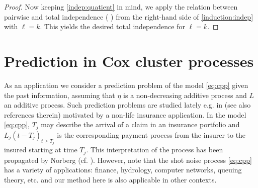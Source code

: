 \documentclass[11pt,leqno%
]{amsart}
\newcommand{\E }{{\mathbb E}}
\newcommand{\1}{{\mathbf 1}}
\begin{document}
\begin{proof}
Now keeping \eqref{indep:quatient} in mind, we apply the
 relation between pairwise and total independence (%
 \cite[Lemma 3.8]{kallenberg:1983}) from the right-hand side of
 \eqref{induction:indep} with $\ell=k$. This yields the desired total independence for $\ell=k$.
\end{proof}

\section{Prediction in Cox cluster processes}\label{sec:prediction}
 As an application %
 we consider a prediction
 problem of the model \eqref{eq:cpp} given the past information, 
 assuming that $\eta$ is a non-decreasing additive process and $L$ an
 additive process. 
 Such prediction problems are studied lately e.g. in 
\cite{LBPJ:1999,matsui:mikosch:2010,rolski:tomanek:2011,rolski:tomanek:2014,matsui:rolski:2016,matsui:2016} (see also references therein) motivated by 
 a non-life insurance application. 
 In the model \eqref{eq:cpp}, $T_j$ may describe the arrival of a
 claim in an insurance portfolio and $L_j(t-T_j)_{t\ge T_j}$ is the corresponding payment process from
 the insurer to the insured starting at time $T_j$. 
 This interpretation of the process has been propagated by Norberg
 \cite{norberg:1993} (cf. \cite{norberg:1999}). However, note that the shot noise process
 \eqref{eq:cpp} has a variety of applications: finance, hydrology,
 computer networks, queuing theory, etc. and our method here is also 
 applicable in other contexts.
\end{document}
